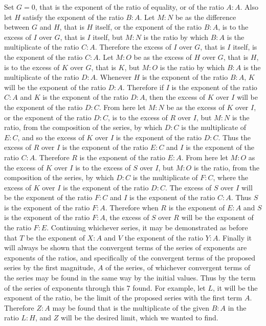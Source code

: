 \documentclass[11pt,letterpaper]{book}
\begin{document}

Set $G=0$, that is the exponent of the ratio of equality, or of the ratio $A:A$.
Also let $H$ satisfy the exponent of the ratio $B:A$. Let $M:N$ be as the
difference between $G$ and $H$, that is $H$ itself, or the exponent of the ratio
$B:A$, is to the excess of $I$ over $G$, that is $I$ itself, but
$M:N$ is the ratio by which $B:A$ is the multiplicate of the ratio $C:A$. Therefore
the excess of $I$ over $G$, that is $I$ itself, is the exponent of
the ratio $C:A$. Let $M:O$ be as the excess of $H$ over $G$, that is
$H$, is to the excess of $K$ over $G$, that is $K$, but $M:O$ is the
ratio by which $B:A$ is the multiplicate of the ratio $D:A$. Whenever $H$ is the
exponent of the ratio $B:A$, $K$ will be the exponent of the ratio $D:A$.
Therefore if $I$ is the exponent of the ratio $C:A$ and $K$ is the exponent of
the ratio $D:A$, then the excess of $K$ over $I$ will be the exponent
of the ratio $D:C$. From here let $M:N$ be as the excess of $K$ over
$I$, or the exponent of the ratio $D:C$, is to the excess of $R$ over
$I$, but $M:N$ is the ratio, from the composition of the series, by which $D:C$
is the multiplicate of $E:C$, and so the excess of $K$ over $I$ is the
exponent of the ratio $D:C$. Thus the excess of $R$ over $I$ is the
exponent of the ratio $E:C$ and $I$ is the exponent of the ratio $C:A$.
Therefore $R$ is the exponent of the ratio $E:A$. From here let $M:O$ as the
excess of $K$ over $I$ is to the excess of $S$ over $I$,
but $M:O$ is the ratio, from the composition of the series, by which $D:C$ is 
the multiplicate of $F:C$, where the excess of $K$ over $I$ is the
exponent of the ratio $D:C$. The excess of $S$ over $I$ will be the
exponent of the ratio $F:C$ and $I$ is the exponent of the ratio $C:A$. Thus $S$
is the exponent of the ratio $F:A$. Therefore when $R$ is the exponent of $E:A$
and $S$ is the exponent of the ratio $F:A$, the excess of $S$ over
$R$ will be the exponent of the ratio $F:E$. Continuing whichever series, it may
be demonstrated as before that $T$ be the exponent of $X:A$ and $V$ the exponent
of the ratio $Y:A$. Finally it will always be shown that the convergent terms of
the series of exponents are exponents of the ratios, and specifically of the
convergent terms of the proposed series by the first magnitude, $A$ of the
series, of whichever convergent terms of the series may be found in the same way
by the initial values. Thus by the term of the series of exponents through this
7 found. For example, let $L$, it will be the exponent of the ratio, be the
limit of the proposed series with the first term $A$. Therefore $Z:A$ may be
found that is the multiplicate of the given $B:A$ in the ratio $L:H$, and $Z$
will be the desired limit, which we wanted to find.
\end{document}
